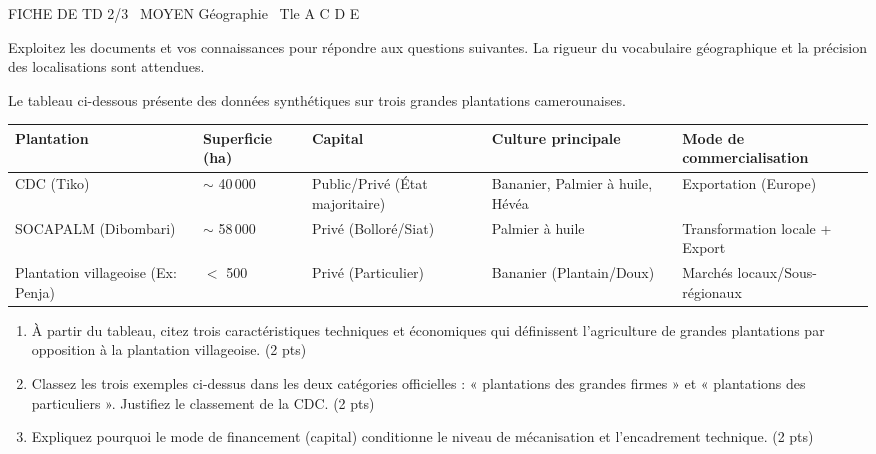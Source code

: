 \documentclass[11pt]{article}
\begin{document}
\begin{tcolorbox}[enhanced,colback=popink,colframe=popink,arc=10pt,boxrule=0pt,left=12pt,right=12pt,top=9pt,bottom=9pt]
{\color{white}\popxbold\small FICHE DE TD 2/3 \textbullet\ MOYEN \hfill Géographie \textbullet\ Tle A C D E\par}
\end{tcolorbox}
\vspace{4pt}
\noindent Exploitez les documents et vos connaissances pour répondre aux questions suivantes. La rigueur du vocabulaire géographique et la précision des localisations sont attendues.

\begin{exercice}
\noindent Le tableau ci-dessous présente des données synthétiques sur trois grandes plantations camerounaises.

\begin{tabularx}{\linewidth}{>{\raggedright\arraybackslash}X>{\centering\arraybackslash}X>{\centering\arraybackslash}X>{\centering\arraybackslash}X>{\raggedright\arraybackslash}X}
\toprule
\textbf{Plantation} & \textbf{Superficie (ha)} & \textbf{Capital} & \textbf{Culture principale} & \textbf{Mode de commercialisation} \\
\midrule
CDC (Tiko) & $\sim$ 40\,000 & Public/Privé (État majoritaire) & Bananier, Palmier à huile, Hévéa & Exportation (Europe) \\
SOCAPALM (Dibombari) & $\sim$ 58\,000 & Privé (Bolloré/Siat) & Palmier à huile & Transformation locale + Export \\
Plantation villageoise (Ex: Penja) & $<$ 500 & Privé (Particulier) & Bananier (Plantain/Doux) & Marchés locaux/Sous-régionaux \\
\bottomrule
\end{tabularx}

\begin{enumerate}
    \item À partir du tableau, citez trois caractéristiques techniques et économiques qui définissent l'agriculture de grandes plantations par opposition à la plantation villageoise. \hfill (2 pts)
    \item Classez les trois exemples ci-dessus dans les deux catégories officielles : « plantations des grandes firmes » et « plantations des particuliers ». Justifiez le classement de la CDC. \hfill (2 pts)
    \item Expliquez pourquoi le mode de financement (capital) conditionne le niveau de mécanisation et l'encadrement technique. \hfill (2 pts)
\end{enumerate}
\end{exercice}
\end{document}
